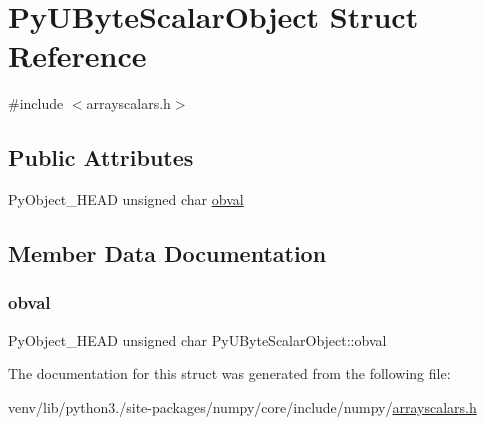 \hypertarget{structPyUByteScalarObject}{}\section{Py\+U\+Byte\+Scalar\+Object Struct Reference}
\label{structPyUByteScalarObject}


{\ttfamily \#include $<$arrayscalars.\+h$>$}

\subsection*{Public Attributes}
\begin{DoxyCompactItemize}
\item 
Py\+Object\+\_\+\+H\+E\+AD unsigned char \hyperlink{structPyUByteScalarObject_a2229fc75dac09ac91c657c6929cb04a1}{obval}
\end{DoxyCompactItemize}


\subsection{Member Data Documentation}
\mbox{\label{structPyUByteScalarObject_a2229fc75dac09ac91c657c6929cb04a1}} 
\subsubsection{\texorpdfstring{obval}{obval}}
{\footnotesize\ttfamily Py\+Object\+\_\+\+H\+E\+AD unsigned char Py\+U\+Byte\+Scalar\+Object\+::obval}



The documentation for this struct was generated from the following file\+:\begin{DoxyCompactItemize}
\item 
venv/lib/python3./site-\/packages/numpy/core/include/numpy/\hyperlink{arrayscalars_8h}{arrayscalars.\+h}\end{DoxyCompactItemize}
